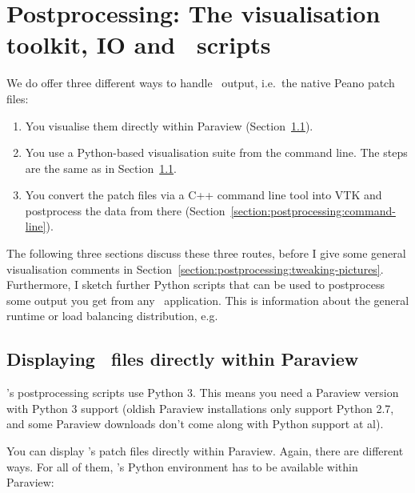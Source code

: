 \chapter{Postprocessing: The visualisation toolkit, IO and \Peano\
scripts}
\label{chapter:postprocessing}



We do offer three different ways to handle \Peano\ output, i.e.~the native Peano
patch files:

\begin{enumerate}
  \item You visualise them directly within Paraview (Section~\ref{label:postprocessing:display-in-paraview}).
  \item You use a Python-based visualisation suite from the command line. The steps 
  are the same as in Section~\ref{label:postprocessing:display-in-paraview}.
  \item You convert the patch files via a C++ command line tool into VTK and
  postprocess the data from there
  (Section~\ref{section:postprocessing:command-line}).
\end{enumerate}


\noindent
The following three sections discuss these three routes, before I give some
general visualisation comments in
Section~\ref{section:postprocessing:tweaking-pictures}. 
Furthermore, I sketch further Python scripts that can be used to postprocess
some output you get from any \Peano\ application.
This is information about the general runtime or load balancing distribution,
e.g.


\section{Displaying \Peano\ files directly within Paraview}
\label{label:postprocessing:display-in-paraview}

\begin{remark}
  \Peano's postprocessing scripts use Python 3. This means you need a Paraview
  version with Python 3 support (oldish Paraview installations only support
  Python 2.7, and some Paraview downloads don't come along with Python support
  at al).
\end{remark}


\noindent
You can display \Peano's patch files directly within Paraview. 
Again, there are different ways.
For all of them, \Peano's Python environment has to be available within Paraview:



